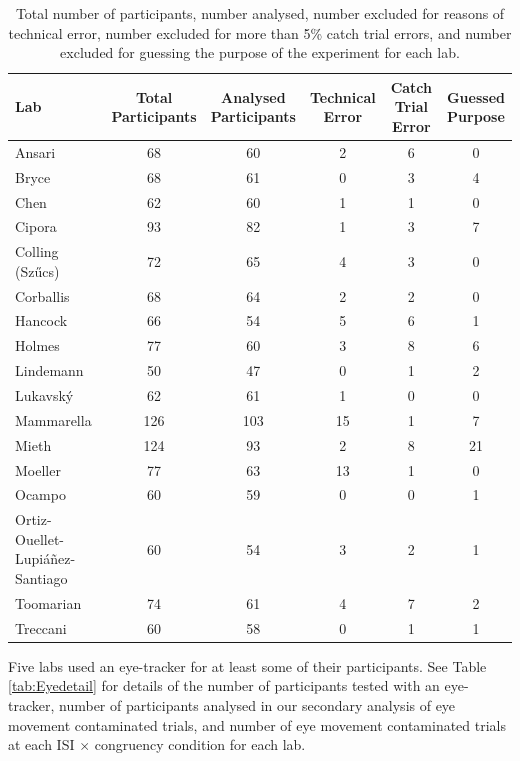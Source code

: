 \documentclass[A4paper,man,floatsintext]{apa6}
\theoremstyle{definition}
\theoremstyle{definition}
\theoremstyle{definition}
\theoremstyle{remark}
\begin{document}
\begin{table}[!h]

\caption{\label{tab:Exclusions}Total number of participants, number analysed, number excluded for reasons of technical error, number excluded for more than 5\% catch trial errors, and number excluded for guessing the purpose of the experiment for each lab.}
\centering
\begin{tabular}[t]{lccccc}
\toprule
Lab & \makecell[c]{Total\\Participants} & \makecell[c]{Analysed\\Participants} & \makecell[c]{Technical\\Error} & \makecell[c]{Catch Trial\\Error} & \makecell[c]{Guessed\\Purpose}\\
\midrule
Ansari & 68 & 60 & 2 & 6 & 0\\
Bryce & 68 & 61 & 0 & 3 & 4\\
Chen & 62 & 60 & 1 & 1 & 0\\
Cipora & 93 & 82 & 1 & 3 & 7\\
Colling (Szűcs) & 72 & 65 & 4 & 3 & 0\\
Corballis & 68 & 64 & 2 & 2 & 0\\
Hancock & 66 & 54 & 5 & 6 & 1\\
Holmes & 77 & 60 & 3 & 8 & 6\\
Lindemann & 50 & 47 & 0 & 1 & 2\\
Lukavský & 62 & 61 & 1 & 0 & 0\\
Mammarella & 126 & 103 & 15 & 1 & 7\\
Mieth & 124 & 93 & 2 & 8 & 21\\
Moeller & 77 & 63 & 13 & 1 & 0\\
Ocampo & 60 & 59 & 0 & 0 & 1\\
Ortiz-Ouellet-Lupiáñez-Santiago & 60 & 54 & 3 & 2 & 1\\
Toomarian & 74 & 61 & 4 & 7 & 2\\
Treccani & 60 & 58 & 0 & 1 & 1\\
\bottomrule
\end{tabular}
\end{table}

Five labs used an eye-tracker for at least some of their participants.
See Table \ref{tab:Eyedetail} for details of the number of participants
tested with an eye-tracker, number of participants analysed in our
secondary analysis of eye movement contaminated trials, and number of
eye movement contaminated trials at each ISI \(\times\) congruency
condition for each lab.
\end{document}
